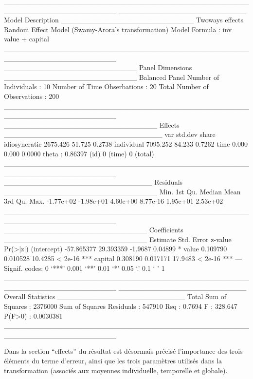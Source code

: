 \documentclass[a4paper]{article}
\begin{document}
\begin{Schunk}
\begin{Soutput}
______________________________________________________________________ 
_________________________ Model Description __________________________
Twoways effects
Random Effect Model (Swamy-Arora's transformation)
Model Formula             : inv ~ value + capital
______________________________________________________________________ 
__________________________ Panel Dimensions __________________________
Balanced Panel
Number of Individuals        :  10
Number of Time Obserbations  :  20
Total Number of Observations :  200
______________________________________________________________________ 
______________________________ Effects _______________________________
                   var  std.dev  share
idiosyncratic 2675.426   51.725 0.2738
individual    7095.252   84.233 0.7262
time             0.000    0.000 0.0000
theta  : 0.86397 (id) 0 (time) 0 (total)
______________________________________________________________________ 
_____________________________ Residuals ______________________________
     Min.   1st Qu.    Median      Mean   3rd Qu.      Max. 
-1.77e+02 -1.98e+01  4.60e+00  8.77e-16  1.95e+01  2.53e+02 
______________________________________________________________________ 
____________________________ Coefficients ____________________________
              Estimate Std. Error z-value Pr(>|z|)    
(intercept) -57.865377  29.393359 -1.9687  0.04899 *  
value         0.109790   0.010528 10.4285  < 2e-16 ***
capital       0.308190   0.017171 17.9483  < 2e-16 ***
---
Signif. codes:  0 ‘***’ 0.001 ‘**’ 0.01 ‘*’ 0.05 ‘.’ 0.1 ‘ ’ 1 
______________________________________________________________________ 
_________________________ Overall Statistics _________________________
Total Sum of Squares       : 2376000
Sum of Squares Residuals   : 547910
Rsq                        : 0.7694
F                          : 328.647
P(F>0)                     : 0.0030381
______________________________________________________________________ 
\end{Soutput}
\end{Schunk}


Dans la section ``effects'' du résultat est désormais précisé
l'importance des trois éléments du terme d'erreur, ainsi que les trois
paramètres utilisés dans la transformation (associés aux moyennes
individuelle, temporelle et globale).
\end{document}
